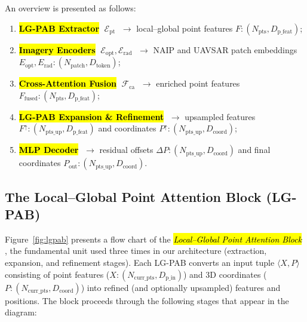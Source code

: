\documentclass[remotesensing,article,accept,pdftex,moreauthors]{Definitions/mdpi}
\begin{document}
An overview is presented as follows:

\begin{enumerate}[leftmargin=*]
\item \textbf{\hl{LG-PAB Extractor} %
} $\;\mathcal{E}_{\mathrm{pt}}$
      $\;\rightarrow$ local–global point features $F: (N_{\text{pts}}, D_{\text{p\_feat}})$;
\item \textbf{\hl{Imagery Encoders}} $\;\mathcal{E}_{\mathrm{opt}},\mathcal{E}_{\mathrm{rad}}$
      $\;\rightarrow$ NAIP and UAVSAR patch embeddings $E_{\text{opt}}, E_{\text{rad}}: (N_{\text{patch}}, D_{\text{token}})$;
\item \textbf{\hl{Cross-Attention Fusion}} $\;\mathcal{F}_{\mathrm{ca}}$
      $\;\rightarrow$ enriched point features $F_{\!\mathrm{fused}}: (N_{\text{pts}}, D_{\text{p\_feat}})$;
\item \textbf{\hl{LG-PAB Expansion \& Refinement}}
      $\;\rightarrow$ upsampled features $F^{\uparrow}: (N_{\text{pts\_up}}, D_{\text{p\_feat}})$ and coordinates $P^{\uparrow}: (N_{\text{pts\_up}}, D_{\text{coord}})$;
\item \textbf{\hl{MLP Decoder}} $\;\rightarrow$ residual offsets $\Delta P: (N_{\text{pts\_up}}, D_{\text{coord}})$ and final coordinates $P_{\mathrm{out}}: (N_{\text{pts\_up}}, D_{\text{coord}})$.
\end{enumerate}

\subsection{The Local–Global Point Attention Block (LG-PAB)}
\label{sec:lgpab}



Figure~\ref{fig:lgpab} presents a flow chart of the \emph{\hl{Local–Global Point Attention Block}%
}, the fundamental unit used three times in our architecture (extraction, expansion, and refinement stages). Each LG-PAB converts an input tuple $\langle X, P \rangle$ consisting of point features ($X: (N_{\text{curr\_pts}}, D_{\text{p\_in}})$) and 3D coordinates ($P: (N_{\text{curr\_pts}}, D_{\text{coord}})$) into refined (and optionally upsampled) features and positions. The block proceeds through the following stages that appear in the diagram:
\end{document}
